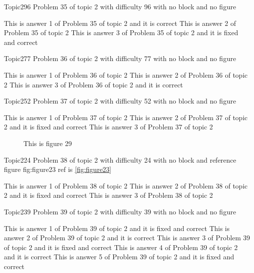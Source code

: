 \documentclass[master]{exam}
\begin{document}
\begin{problem}{Topic2}{96}
	Problem 35 of topic 2 with difficulty 96 with no block and no figure
	\begin{answers}
		\answer[correct] This is answer 1 of Problem 35 of topic 2 and it is correct
		\answer This is answer 2 of Problem 35 of topic 2 
		 This is answer 3 of Problem 35 of topic 2 and it is fixed and correct
	\end{answers}
\end{problem}

\begin{problem}{Topic2}{77}
	Problem 36 of topic 2 with difficulty 77 with no block and no figure
	\begin{answers}
		\answer This is answer 1 of Problem 36 of topic 2 
		\answer This is answer 2 of Problem 36 of topic 2 
		\answer[correct] This is answer 3 of Problem 36 of topic 2 and it is correct
	\end{answers}
\end{problem}

\begin{problem}{Topic2}{52}
	Problem 37 of topic 2 with difficulty 52 with no block and no figure
	\begin{answers}
		\answer This is answer 1 of Problem 37 of topic 2 
		 This is answer 2 of Problem 37 of topic 2 and it is fixed and correct
		\answer This is answer 3 of Problem 37 of topic 2 
	\end{answers}
\end{problem}



\begin{figure}
	\begin{center}
		This is figure 29 
		\label{fig:figure29}
	\end{center}
\end{figure}

\begin{problem}{Topic2}{24}
	Problem 38 of topic 2 with difficulty 24 with no block and reference figure fig:figure23 ref is \ref{fig:figure23}
	\begin{answers}
		\answer This is answer 1 of Problem 38 of topic 2 
		 This is answer 2 of Problem 38 of topic 2 and it is fixed and correct
		\answer This is answer 3 of Problem 38 of topic 2 
	\end{answers}
\end{problem}

\begin{problem}{Topic2}{39}
	Problem 39 of topic 2 with difficulty 39 with no block and no figure
	\begin{answers}
		 This is answer 1 of Problem 39 of topic 2 and it is fixed and correct
		\answer[correct] This is answer 2 of Problem 39 of topic 2 and it is correct
		 This is answer 3 of Problem 39 of topic 2 and it is fixed and correct
		\answer[correct] This is answer 4 of Problem 39 of topic 2 and it is correct
		 This is answer 5 of Problem 39 of topic 2 and it is fixed and correct
	\end{answers}
\end{problem}
\end{document}
